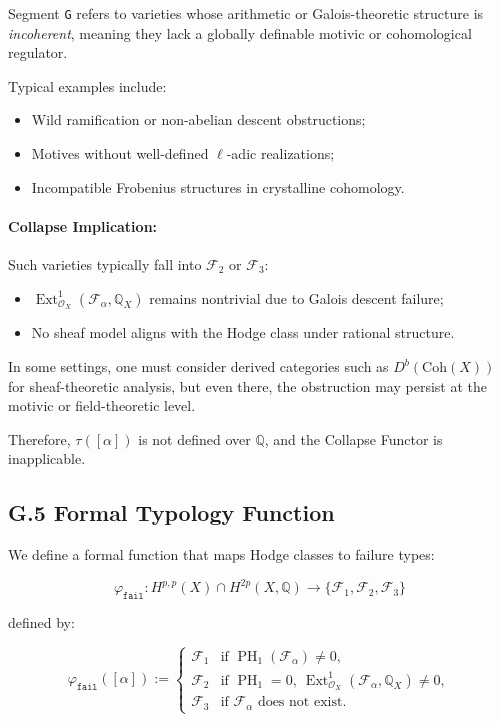 \documentclass[11pt]{article}
\DeclareMathOperator{\Ext}{Ext}
\DeclareMathOperator{\PH}{PH}
\begin{document}
Segment \texttt{G} refers to varieties whose arithmetic or Galois-theoretic structure is \emph{incoherent}, meaning they lack a globally definable motivic or cohomological regulator.

Typical examples include:

\begin{itemize}
  \item Wild ramification or non-abelian descent obstructions;
  \item Motives without well-defined $\ell$-adic realizations;
  \item Incompatible Frobenius structures in crystalline cohomology.
\end{itemize}

\paragraph{Collapse Implication:}

Such varieties typically fall into $\mathcal{F}_2$ or $\mathcal{F}_3$:

\begin{itemize}
  \item $\Ext^1_{\mathcal{O}_X}(\mathcal{F}_\alpha, \mathbb{Q}_X)$ remains nontrivial due to Galois descent failure;
  \item No sheaf model aligns with the Hodge class under rational structure.
\end{itemize}

In some settings, one must consider derived categories such as $D^b(\mathrm{Coh}(X))$ for sheaf-theoretic analysis, but even there, the obstruction may persist at the motivic or field-theoretic level.

Therefore, $\tau([\alpha])$ is not defined over $\mathbb{Q}$, and the Collapse Functor is inapplicable.

\subsection*{G.5 Formal Typology Function}

We define a formal function that maps Hodge classes to failure types:

\[
\varphi_{\texttt{fail}} : H^{p,p}(X) \cap H^{2p}(X, \mathbb{Q}) \to \{ \mathcal{F}_1, \mathcal{F}_2, \mathcal{F}_3 \}
\]

defined by:

\[
\varphi_{\texttt{fail}}([\alpha]) :=
\begin{cases}
\mathcal{F}_1 & \text{if } \PH_1(\mathcal{F}_\alpha) \ne 0, \\
\mathcal{F}_2 & \text{if } \PH_1 = 0,\ \Ext^1_{\mathcal{O}_X}(\mathcal{F}_\alpha, \mathbb{Q}_X) \ne 0, \\
\mathcal{F}_3 & \text{if } \mathcal{F}_\alpha \text{ does not exist}.
\end{cases}
\]
\end{document}
